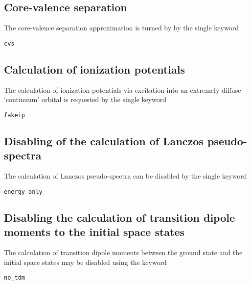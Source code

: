\documentclass[12pt]{article}
\newcommand*\code[1]{\mbox{\texttt{{#1}}}} %
\begin{document}
\subsection*{Core-valence separation}
\noindent
The core-valence separation approximation is turned by by the single
keyword 

\vspace{0.2cm}
\code{cvs}

\subsection*{Calculation of ionization potentials}
\noindent
The calculation of ionization potentials via excitation into an
extremely diffuse `continuum' orbital is requested by the single
keyword

\vspace{0.2cm}
\code{fakeip}

\subsection*{Disabling of the calculation of Lanczos pseudo-spectra}
\noindent
The calculation of Lanczos pseudo-spectra can be disabled by the
single keyword 

\vspace{0.2cm}
\code{energy\_only}

\subsection*{Disabling the calculation of transition dipole moments to
the initial space states}
\noindent
The calculation of transition dipole moments between the ground state
and the initial space states may be disabled using the keyword

\vspace{0.2cm}
\code{no\_tdm}
\end{document}
